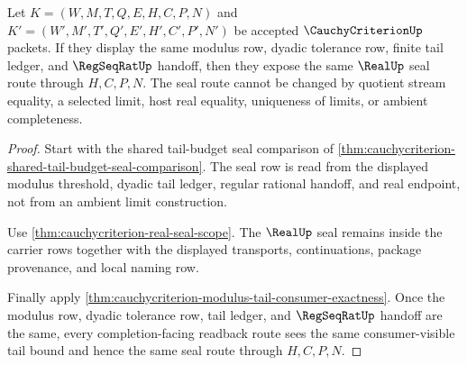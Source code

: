 \begin{theorem}
\label{thm:cauchycriterion-tail-budget-seal-determinacy}
Let $K=(W,M,T,Q,E,H,C,P,N)$ and $K'=(W',M',T',Q',E',H',C',P',N')$ be
accepted $\CauchyCriterionUp$ packets. If they display the same modulus row,
dyadic tolerance row, finite tail ledger, and $\RegSeqRatUp$ handoff, then
they expose the same $\RealUp$ seal route through $H,C,P,N$. The seal route
cannot be changed by quotient stream equality, a selected limit, host real
equality, uniqueness of limits, or ambient completeness.
\end{theorem}
\begin{proof}
Start with the shared tail-budget seal comparison of
\autoref{thm:cauchycriterion-shared-tail-budget-seal-comparison}. The seal
row is read from the displayed modulus threshold, dyadic tail ledger, regular
rational handoff, and real endpoint, not from an ambient limit construction.

Use \autoref{thm:cauchycriterion-real-seal-scope}. The $\RealUp$ seal remains
inside the carrier rows together with the displayed transports,
continuations, package provenance, and local naming row.

Finally apply
\autoref{thm:cauchycriterion-modulus-tail-consumer-exactness}. Once the
modulus row, dyadic tolerance row, tail ledger, and $\RegSeqRatUp$ handoff are
the same, every completion-facing readback route sees the same consumer-visible
tail bound and hence the same seal route through $H,C,P,N$.
\end{proof}

